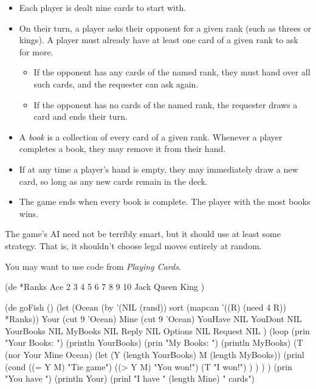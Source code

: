 \begin{itemize}
\item
  Each player is dealt nine cards to start with.
\item
  On their turn, a player asks their opponent for a given rank (such as
  threes or kings). A player must already have at least one card of a
  given rank to ask for more.

  \begin{itemize}
  \item
    If the opponent has any cards of the named rank, they must hand over
    all such cards, and the requester can ask again.
  \item
    If the opponent has no cards of the named rank, the requester draws
    a card and ends their turn.
  \end{itemize}
\item
  A \emph{book} is a collection of every card of a given rank. Whenever
  a player completes a book, they may remove it from their hand.
\item
  If at any time a player's hand is empty, they may immediately draw a
  new card, so long as any new cards remain in the deck.
\item
  The game ends when every book is complete. The player with the most
  books wins.
\end{itemize}

The game's AI need not be terribly smart, but it should use at least
some strategy. That is, it shouldn't choose legal moves entirely at
random.

You may want to use code from \emph{Playing
Cards}.



\begin{wideverbatim}

(de *Ranks
   Ace 2 3 4 5 6 7 8 9 10 Jack Queen King )

(de goFish ()
   (let
      (Ocean (by '(NIL (rand)) sort (mapcan '((R) (need 4 R)) *Ranks))
         Your (cut 9 'Ocean)
         Mine (cut 9 'Ocean)
         YouHave NIL
         YouDont NIL
         YourBooks NIL
         MyBooks NIL
         Reply NIL
         Options NIL
         Request NIL )
      (loop
         (prin "Your Books: ")
         (println YourBooks)
         (prin "My Books:   ")
         (println MyBooks)
         (T (nor Your Mine Ocean)
            (let (Y (length YourBooks)  M (length MyBooks))
               (prinl
                  (cond
                     ((= Y M) "Tie game")
                     ((> Y M) "You won!")
                     (T "I won!") ) ) ) )
         (prin "You have ")
         (println Your)
         (prinl "I have " (length Mine) " cards")

\end{wideverbatim}


